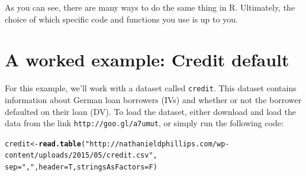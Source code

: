 \documentclass{tufte-book}\usepackage[]{graphicx}\usepackage[]{color}
\makeatletter
\newcommand{\hlnum}[1]{\textcolor[rgb]{0.686,0.059,0.569}{#1}}%
\newcommand{\hlstr}[1]{\textcolor[rgb]{0.192,0.494,0.8}{#1}}%
\newcommand{\hlcom}[1]{\textcolor[rgb]{0.678,0.584,0.686}{\textit{#1}}}%
\newcommand{\hlopt}[1]{\textcolor[rgb]{0,0,0}{#1}}%
\newcommand{\hlstd}[1]{\textcolor[rgb]{0.345,0.345,0.345}{#1}}%
\newcommand{\hlkwb}[1]{\textcolor[rgb]{0.69,0.353,0.396}{#1}}%
\newcommand{\hlkwc}[1]{\textcolor[rgb]{0.333,0.667,0.333}{#1}}%
\newcommand{\hlkwd}[1]{\textcolor[rgb]{0.737,0.353,0.396}{\textbf{#1}}}%
\newenvironment{kframe}{%
 \def\at@end@of@kframe{}%
 \ifinner\ifhmode%
  \def\at@end@of@kframe{\end{minipage}}%
  \begin{minipage}{\columnwidth}%
 \fi\fi%
 \def\FrameCommand##1{\hskip\@totalleftmargin \hskip-\fboxsep
 \colorbox{shadecolor}{##1}\hskip-\fboxsep
     \hskip-\linewidth \hskip-\@totalleftmargin \hskip\columnwidth}%
 \MakeFramed {\advance\hsize-\width
   \@totalleftmargin\z@ \linewidth\hsize
   \@setminipage}}%
 {\par\unskip\endMakeFramed%
 \at@end@of@kframe}
\newenvironment{knitrout}{}{} %
\makeatother
\begin{document}
\begin{footnotesize}

As you can see, there are many ways to do the same thing in R. Ultimately, the choice of which specific code and functions you use is up to you.

\section{A worked example: Credit default}

For this example, we'll work with a dataset called \texttt{credit}. This dataset contains information about German loan borrowers (IVs) and whether or not the borrower defaulted on their loan (DV). To load the dataset, either download and load the data from the link \texttt{http://goo.gl/a7umut}, or simply run the following code:

\begin{footnotesize}
\begin{knitrout}
\color{fgcolor}\begin{kframe}
\begin{alltt}
\hlstd{credit} \hlkwb{<-} \hlkwd{read.table}\hlstd{(}\hlstr{"http://nathanieldphillips.com/wp-content/uploads/2015/05/credit.csv"}\hlstd{,}
                     \hlkwc{sep} \hlstd{=} \hlstr{","}\hlstd{,} \hlkwc{header} \hlstd{= T,} \hlkwc{stringsAsFactors} \hlstd{= F)}
\end{alltt}
\end{kframe}
\end{knitrout}
\end{footnotesize}


\end{footnotesize}
\end{document}
